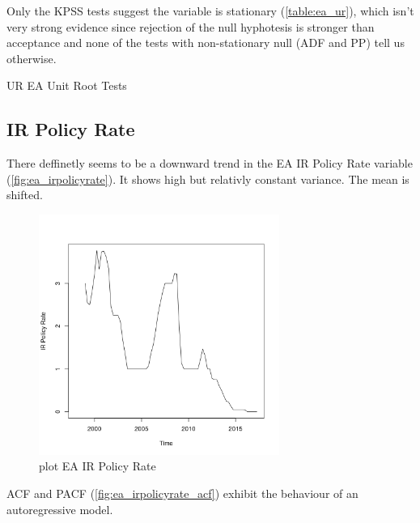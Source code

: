 \documentclass[10pt]{article}
\begin{document}
Only the KPSS tests suggest the variable is stationary (\autoref{table:ea_ur}), which isn't very strong evidence since rejection of the null hyphotesis is stronger than acceptance and none of the tests with non-stationary null (ADF and PP) tell us otherwise.

\begin{table}[h!]
\centering
{}
\caption{UR EA Unit Root Tests}
\label{table:ea_ur}
\end{table}



\subsection{IR Policy Rate}

There deffinetly seems to be a downward trend in the EA IR Policy Rate variable (\autoref{fig:ea_irpolicyrate}).  It shows high but relativly constant variance. The mean is shifted.

\begin{figure}[h!]
\centering
\includegraphics[width = 0.7\textwidth]{"../plots/ea_IR Policy Rate"}
\caption{plot EA IR Policy Rate}
\label{fig:ea_irpolicyrate}
\end{figure}

ACF and PACF (\autoref{fig:ea_irpolicyrate_acf}) exhibit the behaviour of an autoregressive model.
\end{document}
